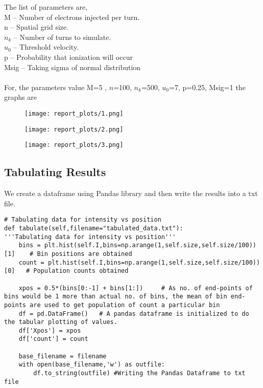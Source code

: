 \documentclass{article}
\begin{document}
The list of parameters are,\\
M -- Number of electrons injected per turn.\\
n -- Spatial grid size.\\
$n_{k}$ -- Number of turns to simulate.\\
$u_{0}$ -- Threshold velocity.\\
p -- Probability that ionization will occur\\               
Msig -- Taking sigma of normal distribution\\
\\
For, the parameters value M=5 , $n$=100, $n_{k}$=500, $u_{0}$=7, p=0.25, Msig=1 the graphs are
\begin{figure}[!tbh]
    \centering
    \texttt{[image: report\_plots/1.png]}
\end{figure}
\begin{figure}[!tbh]
    \centering
    \texttt{[image: report\_plots/2.png]}
\end{figure}
\begin{figure}[!tbh]
    \centering
    \texttt{[image: report\_plots/3.png]}
\end{figure}

\newpage
\subsection{Tabulating Results}

We create a dataframe using Pandas library and then write the results into a txt file.

\begin{lstlisting}
# Tabulating data for intensity vs position
def tabulate(self,filename="tabulated_data.txt"):
'''Tabulating data for intensity vs position'''
    bins = plt.hist(self.I,bins=np.arange(1,self.size,self.size/100))[1]    # Bin positions are obtained
    count = plt.hist(self.I,bins=np.arange(1,self.size,self.size/100))[0]   # Population counts obtained

    xpos = 0.5*(bins[0:-1] + bins[1:])     # As no. of end-points of bins would be 1 more than actual no. of bins, the mean of bin end-points are used to get population of count a particular bin
    df = pd.DataFrame()   # A pandas dataframe is initialized to do the tabular plotting of values.
    df['Xpos'] = xpos
    df['count'] = count

    base_filename = filename
    with open(base_filename,'w') as outfile:
        df.to_string(outfile) #Writing the Pandas Dataframe to txt file

\end{lstlisting}
\end{document}
